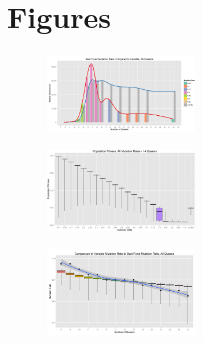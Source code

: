 \documentclass{sig-alternate}
\begin{document}
\section{Figures}
\begin{figure}[h]
\centering
\includegraphics[width=0.35\textwidth]{best_solution_all_queens.png}
\vspace{-12pt}
\caption{}
\label{fig:best_solution_all_queens}
\end{figure}

\begin{figure}[h]
\centering
\includegraphics[width=0.35\textwidth]{fitness_all_mutation_14q.png}
\vspace{-12pt}
\caption{}
\label{fig:fitness_all_mutation_14}
\end{figure}


\begin{figure}[h]
\centering
\includegraphics[width=0.35\textwidth]{mutation_rate_all_queens.png}
\vspace{-12pt}
\caption{}
\label{fig:mutation_rate_all_queens}
\end{figure}
\end{document}

